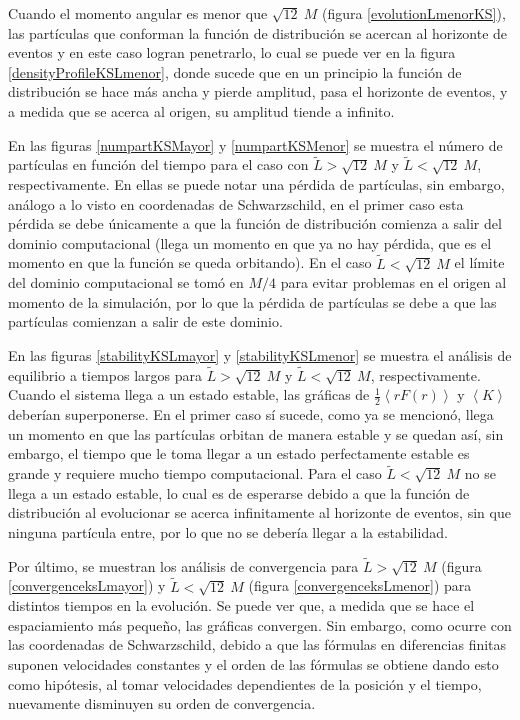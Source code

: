 \documentclass[11pt,twoside,openright,spanish]{report}
\numberwithin{equation}{chapter}
\numberwithin{figure}{chapter}
\numberwithin{table}{chapter}
\begin{document}
Cuando el momento angular es menor que $\sqrt{12}\ M$ (figura \ref{evolutionLmenorKS}), las partículas que conforman la función de distribución se acercan al horizonte de eventos y en este caso logran penetrarlo, lo cual se puede ver en la figura \ref{densityProfileKSLmenor}, donde sucede que en un principio la función de distribución se hace más ancha y pierde amplitud, pasa el horizonte de eventos, y a medida que se acerca al origen, su amplitud tiende a infinito.

En las figuras \ref{numpartKSMayor} y \ref{numpartKSMenor} se muestra el número de partículas en función del tiempo para el caso con $\tilde{L}>\sqrt{12}\ M$ y $\tilde{L}<\sqrt{12}\ M$, respectivamente. En ellas se puede notar una pérdida de partículas, sin embargo, análogo a lo visto en coordenadas de Schwarzschild, en el primer caso esta pérdida se debe únicamente a que la función de distribución comienza a salir del dominio computacional (llega un momento en que ya no hay pérdida, que es el momento en que la función se queda orbitando). En el caso $\tilde{L}<\sqrt{12}\ M$ el límite del dominio computacional se tomó en $M/4$ para evitar problemas en el origen al momento de la simulación, por lo que la pérdida de partículas se debe a que las partículas comienzan a salir de este dominio.

En las figuras \ref{stabilityKSLmayor} y \ref{stabilityKSLmenor} se muestra el análisis de equilibrio a tiempos largos para $\tilde{L}>\sqrt{12}\ M$ y $\tilde{L}<\sqrt{12}\ M$, respectivamente. Cuando el sistema llega a un estado estable, las gráficas de $\frac{1}{2}\left<rF(r)\right>$ y $\left<K\right>$ deberían superponerse. En el primer caso sí sucede, como ya se mencionó, llega un momento en que las partículas orbitan de manera estable y se quedan así, sin embargo, el tiempo que le toma llegar a un estado perfectamente estable es grande y requiere mucho tiempo computacional. Para el caso $\tilde{L}<\sqrt{12}\ M$ no se llega a un estado estable, lo cual es de esperarse debido a que la función de distribución al evolucionar se acerca infinitamente al horizonte de eventos, sin que ninguna partícula entre, por lo que no se debería llegar a la estabilidad.

Por último, se muestran los análisis de convergencia para $\tilde{L}>\sqrt{12}\ M$ (figura \ref{convergenceksLmayor}) y $\tilde{L}<\sqrt{12}\ M$ (figura \ref{convergenceksLmenor}) para distintos tiempos en la evolución. Se puede ver que, a medida que se hace el espaciamiento más pequeño, las gráficas convergen. Sin embargo, como ocurre con las coordenadas de Schwarzschild, debido a que las fórmulas en diferencias finitas suponen velocidades constantes y el orden de las fórmulas se obtiene dando esto como hipótesis, al tomar velocidades dependientes de la posición y el tiempo, nuevamente disminuyen su orden de convergencia.
\end{document}
